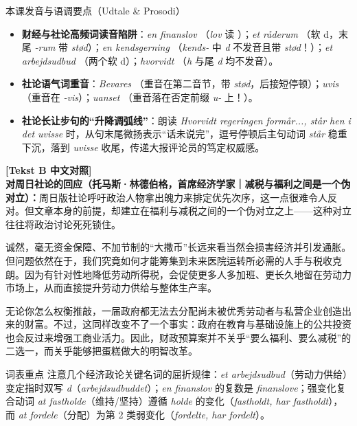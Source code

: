\begin{tipbox}{本课发音与语调要点（Udtale \& Prosodi）}
\begin{itemize}
  \item \textbf{财经与社论高频词读音陷阱}：\textit{en finanslov} （\textit{lov} 读 ）；\textit{et råderum} （软 d，末尾 \textit{-rum} 带 \textit{stød}）；\textit{en kendsgerning} （\textit{kends-} 中 \textit{d} 不发音且带 \textit{stød}！）；\textit{et arbejdsudbud} （两个软 d）；\textit{hvorvidt} （\textit{h} 与尾 \textit{d} 均不发音）。
  \item \textbf{社论语气词重音}：\textit{Bevares} （重音在第二音节，带 \textit{stød}，后接短停顿）；\textit{uvis} （重音在 \textit{-vis}）；\textit{uanset} （重音落在否定前缀 \textit{u-} 上！）。
  \item \textbf{社论长让步句的“升降调弧线”}：朗读 \textit{Hvorvidt regeringen formår..., står hen i det uvisse} 时，从句末尾微扬表示“话未说完”，逗号停顿后主句动词 \textit{står} 稳重下沉，落到 \textit{uvisse} 收尾，传递大报评论员的笃定权威感。
\end{itemize}
\end{tipbox}

\begin{transbox}
\small
\textbf{\color{NCDTeal}[Tekst B 中文对照]}\\
\textbf{对周日社论的回应（托马斯·林德伯格，首席经济学家｜减税与福利之间是一个伪对立）：}周日版社论呼吁政治人物拿出魄力来排定优先次序，这一点很难令人反对。但文章本身的前提，却建立在福利与减税之间的一个伪对立之上——这种对立往往将政治讨论死死锁住。

诚然，毫无资金保障、不加节制的“大撒币”长远来看当然会损害经济并引发通胀。但问题依然在于，我们究竟如何才能筹集到未来医院运转所必需的人手与税收克朗。因为有针对性地降低劳动所得税，会促使更多人多加班、更长久地留在劳动力市场上，从而直接提升劳动力供给与整体生产率。

无论你怎么权衡推敲，一届政府都无法去分配尚未被优秀劳动者与私营企业创造出来的财富。不过，这同样改变不了一个事实：政府在教育与基础设施上的公共投资也会反过来增强工商业活力。因此，财政预算案并不关乎“要么福利、要么减税”的二选一，而关乎能够把蛋糕做大的明智改革。
\end{transbox}


\begin{tipbox}{词表重点}
注意几个经济政论关键名词的屈折规律：\textit{et arbejdsudbud}（劳动力供给）变定指时双写 \textit{d}（\textit{arbejdsudbuddet}）；\textit{en finanslov} 的复数是 \textit{finanslove}；强变化复合动词 \textit{at fastholde}（维持/坚持）遵循 \textit{holde} 的变化（\textit{fastholdt, har fastholdt}），而 \textit{at fordele}（分配）为第 2 类弱变化（\textit{fordelte, har fordelt}）。
\end{tipbox}

